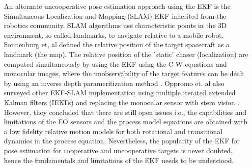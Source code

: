 An alternate uncooperative pose estimation approach using the EKF is the Simultaneous Localization and Mapping (SLAM)-EKF \cite{sonnenburgEKFSlam010339} inherited from the robotics community. SLAM algorithms use characteristic points in the 3D environment, so called landmarks, to navigate relative to a mobile robot. Sonnenburg et, al defined the relative position of the target spacecraft as a landmark (the map). The relative position of the 'static' chaser (localization) are computed simultaneously by using the EKF using the C-W equations and monocular images, where the unobservability of the target features can be dealt by using an inverse depth parameritization method \cite{civeraInverseDepthParameritization08}. Oppromo et. al also surveyed other EKF-SLAM implementation using multiple iterated extended Kalman filters (IEKFs) and replacing the monocular sensor with stero vision \cite{OpromollaPose17}. However, they concluded that there are still open issues i.e., the capabilities and limitations of the EO sensors\footnotemark{} and the process model equations are obtained with a low fidelity relative motion  models for both rotational and transitional dynamics in the process equation. Nevertheless, the popularity of the EKF for pose estimation for cooperative and uncooperative targets is never doubted, hence the fundamentals and limitations of the EKF needs to be understood. 




